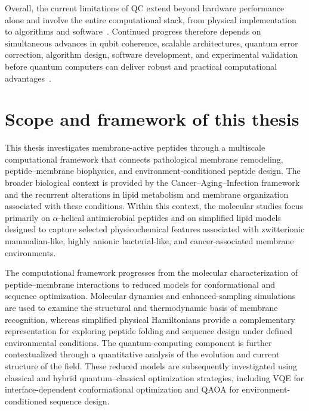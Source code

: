 Overall, the current limitations of QC extend beyond hardware performance alone and involve the entire computational stack, from physical implementation to algorithms and software~\cite{paper_dani,nielsen2010quantum}. Continued progress therefore depends on simultaneous advances in qubit coherence, scalable architectures, quantum error correction, algorithm design, software development, and experimental validation before quantum computers can deliver robust and practical computational advantages~\cite{Palsberg2026,Raseena2025}.










\section{Scope and framework of this thesis}

This thesis investigates membrane-active peptides through a multiscale computational framework that connects pathological membrane remodeling, peptide–membrane biophysics, and environment-conditioned peptide design. The broader biological context is provided by the Cancer–Aging–Infection framework and the recurrent alterations in lipid metabolism and membrane organization associated with these conditions. Within this context, the molecular studies focus primarily on $\alpha$-helical antimicrobial peptides and on simplified lipid models designed to capture selected physicochemical features associated with zwitterionic mammalian-like, highly anionic bacterial-like, and cancer-associated membrane environments.

The computational framework progresses from the molecular characterization of peptide–membrane interactions to reduced models for conformational and sequence optimization. Molecular dynamics and enhanced-sampling simulations are used to examine the structural and thermodynamic basis of membrane recognition, whereas simplified physical Hamiltonians provide a complementary representation for exploring peptide folding and sequence design under defined environmental conditions. The quantum-computing component is further contextualized through a quantitative analysis of the evolution and current structure of the field. These reduced models are subsequently investigated using classical and hybrid quantum–classical optimization strategies, including VQE for interface-dependent conformational optimization and QAOA for environment-conditioned sequence design.

